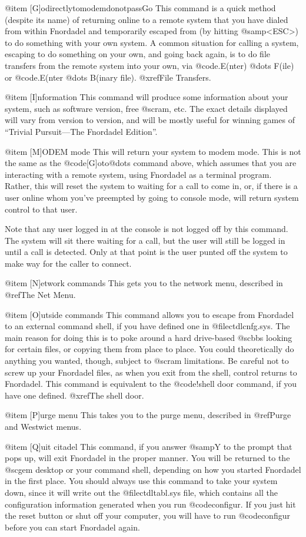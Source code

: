 @item [G]odirectlytomodemdonotpassGo
This command is a quick method (despite its name) of
returning online to a remote system that you have dialed from
within Fnordadel and temporarily escaped from (by hitting @samp{<ESC>})
to do something with your own system.  A common situation for
calling a system, escaping to do something on your own, and going
back again, is to do file transfers from the remote system into
your own, via @code{.E(nter) @dots{} F(ile)} or
@code{.E(nter @dots{} B(inary file)}.
@xref{File Transfers}.

@item [I]nformation
This command will produce some information about your
system, such as software version, free @sc{ram}, etc.  The exact details
displayed will vary from version to version, and will be mostly
useful for winning games of ``Trivial Pursuit---The Fnordadel
Edition''.

@item [M]ODEM mode
This will return your system to modem mode.  This is
not the same as the @code{[G]oto@dots{}} command above, which assumes that you
are interacting with a remote system, using Fnordadel as a
terminal program.  Rather, this will reset the system to waiting for
a call to come in, or, if there is a user online whom you've
preempted by going to console mode, will return system control
to that user.

Note that any user logged in at the console is not logged
off by this command.  The system will sit there waiting for a call,
but the user will still be logged in until a call is detected.  Only
at that point is the user punted off the system to make way for the
caller to connect.

@item [N]etwork commands
This gets you to the network menu, described in @ref{The Net Menu}.

@item [O]utside commands
This command allows you to escape from Fnordadel to an
external command shell, if you have defined one in @file{ctdlcnfg.sys}.  The
main reason for doing this is to poke around a hard drive-based @sc{bbs}
looking for certain files, or copying them from place to place.  You
could theoretically do anything you wanted, though, subject to @sc{ram}
limitations.  Be careful not to screw up your Fnordadel files, as
when you exit from the shell, control returns to Fnordadel.
This command is equivalent to the @code{!shell} door command, if you
have one defined.  @xref{The shell door}.

@item [P]urge menu
This takes you to the purge menu, described in @ref{Purge and Westwict menus}.

@item [Q]uit citadel
This command, if you answer @samp{Y} to the prompt that pops up,
will exit Fnordadel in the proper manner.  You will be returned to
the @sc{gem} desktop or your command shell, depending on how you started
Fnordadel in the first place.  You should always use this command
to take your system down, since it will write out the @file{ctdltabl.sys}
file, which contains all the configuration information generated
when you run @code{configur}.  If you just hit the reset button or shut
off your computer, you will have to run @code{configur} before you
can start Fnordadel again.


